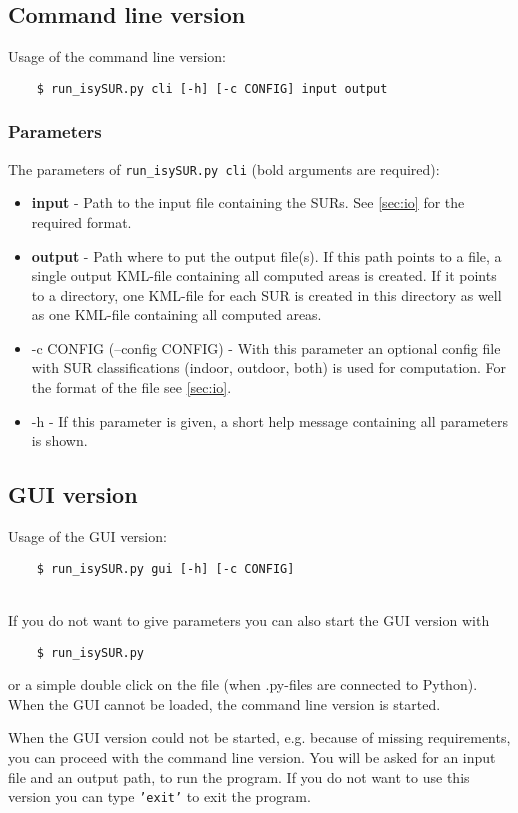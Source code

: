 \documentclass[11pt,fleqn]{book} %
\begin{document}
\subsection{Command line version}\label{sec:cli}
Usage of the command line version:
\begin{verbatim}
	$ run_isySUR.py cli [-h] [-c CONFIG] input output
\end{verbatim}

\subsubsection{Parameters}
The parameters of \texttt{run\_isySUR.py cli} (bold arguments are required):
\begin{itemize}
	\item \textbf{input} - Path to the input file containing the SURs. See \ref{sec:io} for the required format.
	\item \textbf{output} - Path where to put the output file(s). If this path points to a file, a single output KML-file containing all computed areas is created. If it points to a directory, one KML-file for each SUR is created in this directory as well as one KML-file containing all computed areas.
	\item -c CONFIG (--config CONFIG) - With this parameter an optional config file with SUR classifications (indoor, outdoor, both) is used for computation. For the format of the file see \ref{sec:io}.
	\item -h - If this parameter is given, a short help message containing all parameters is shown.
\end{itemize}

\subsection{GUI version}\label{sec:gui}
Usage of the GUI version:
\begin{verbatim}
	$ run_isySUR.py gui [-h] [-c CONFIG]
\end{verbatim}
~\\
If you do not want to give parameters you can also start the GUI version with
\begin{verbatim}
	$ run_isySUR.py
\end{verbatim}
or a simple double click on the file (when .py-files are connected to Python). When the GUI cannot be loaded, the command line version is started.

When the GUI version could not be started, e.g. because of missing requirements, you can proceed with the command line version. You will be asked for an input file and an output path, to run the program. If you do not want to use this version you can type \texttt{'exit'} to exit the program.
\end{document}
